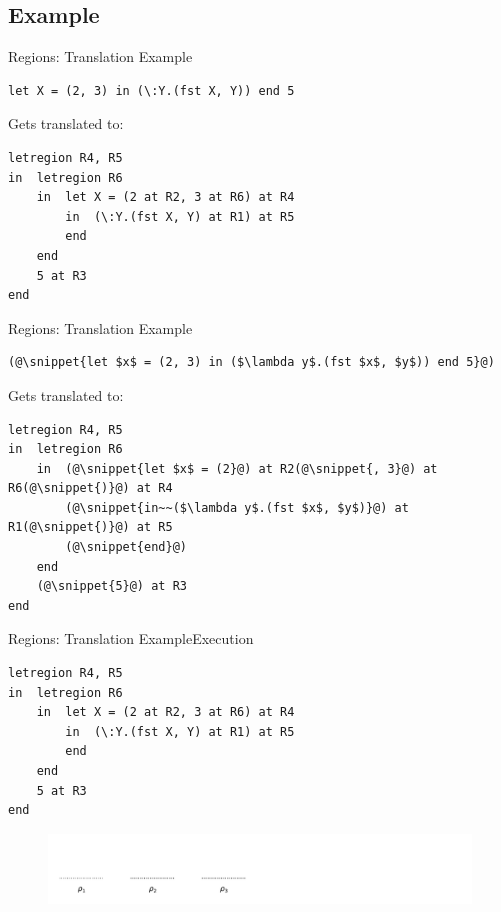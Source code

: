 \documentclass[xcolor=x11names,compress]{beamer}
\newcommand{\snippet}[1] {\textcolor{code}{\texttt{#1}}}
\renewcommand{\(}{\begin{columns}}
\renewcommand{\)}{\end{columns}}
\newcommand{\<}[1]{\begin{column}{#1}}
\renewcommand{\>}{\end{column}}
\begin{document}
\subsection{Example}

\begin{frame}[fragile]{Regions: Translation Example}
\begin{lstlisting}
let X = (2, 3) in (\:Y.(fst X, Y)) end 5
\end{lstlisting}
\pause
Gets translated to:

\begin{lstlisting}
letregion R4, R5
in  letregion R6
    in  let X = (2 at R2, 3 at R6) at R4
        in  (\:Y.(fst X, Y) at R1) at R5
        end
    end
    5 at R3
end
\end{lstlisting}
\end{frame}

\begin{frame}[fragile]{Regions: Translation Example}
\begin{lstlisting}
(@\snippet{let $x$ = (2, 3) in ($\lambda y$.(fst $x$, $y$)) end 5}@)
\end{lstlisting}

Gets translated to:

\begin{lstlisting}
letregion R4, R5
in  letregion R6
    in  (@\snippet{let $x$ = (2}@) at R2(@\snippet{, 3}@) at R6(@\snippet{)}@) at R4
        (@\snippet{in~~($\lambda y$.(fst $x$, $y$)}@) at R1(@\snippet{)}@) at R5
        (@\snippet{end}@)
    end
    (@\snippet{5}@) at R3
end
\end{lstlisting}
\end{frame}

\begin{frame}[fragile]{Regions: Translation Example}{Execution}
\begin{lstlisting}
letregion R4, R5
in  letregion R6
    in  let X = (2 at R2, 3 at R6) at R4
        in  (\:Y.(fst X, Y) at R1) at R5
        end
    end
    5 at R3
end
\end{lstlisting}

\begin{figure}[h]
    \includegraphics[width=\textwidth]{regions-1}
\end{figure}
\end{frame}
\end{document}
